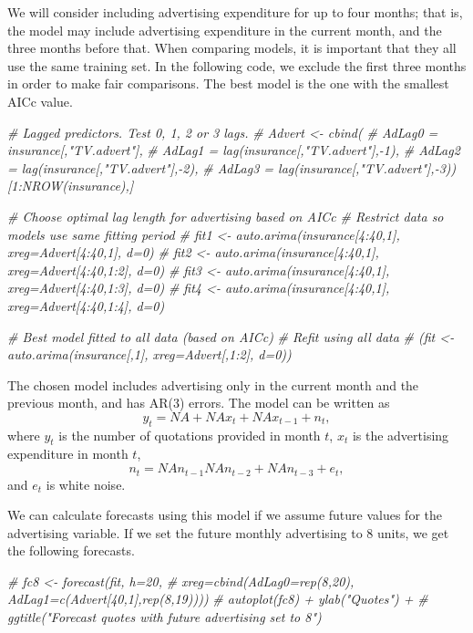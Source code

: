 \documentclass[]{book}
\newenvironment{Shaded}{\begin{snugshade}}{\end{snugshade}}
\newcommand{\CommentTok}[1]{\textcolor[rgb]{0.56,0.35,0.01}{\textit{#1}}}
\begin{document}
We will consider including advertising expenditure for up to four months; that is, the model may include advertising expenditure in the current month, and the three months before that. When comparing models, it is important that they all use the same training set. In the following code, we exclude the first three months in order to make fair comparisons. The best model is the one with the smallest AICc value.

\begin{Shaded}
\begin{Highlighting}[]
\CommentTok{# Lagged predictors. Test 0, 1, 2 or 3 lags.}
\CommentTok{# Advert <- cbind(}
\CommentTok{#   AdLag0 = insurance[,"TV.advert"],}
\CommentTok{#   AdLag1 = lag(insurance[,"TV.advert"],-1),}
\CommentTok{#   AdLag2 = lag(insurance[,"TV.advert"],-2),}
\CommentTok{#   AdLag3 = lag(insurance[,"TV.advert"],-3))[1:NROW(insurance),]}

\CommentTok{# Choose optimal lag length for advertising based on AICc}
\CommentTok{# Restrict data so models use same fitting period}
\CommentTok{# fit1 <- auto.arima(insurance[4:40,1], xreg=Advert[4:40,1], d=0)}
\CommentTok{# fit2 <- auto.arima(insurance[4:40,1], xreg=Advert[4:40,1:2], d=0)}
\CommentTok{# fit3 <- auto.arima(insurance[4:40,1], xreg=Advert[4:40,1:3], d=0)}
\CommentTok{# fit4 <- auto.arima(insurance[4:40,1], xreg=Advert[4:40,1:4], d=0)}

\CommentTok{# Best model fitted to all data (based on AICc)}
\CommentTok{# Refit using all data}
\CommentTok{# (fit <- auto.arima(insurance[,1], xreg=Advert[,1:2], d=0))}
\end{Highlighting}
\end{Shaded}

The chosen model includes advertising only in the current month and the previous month, and has AR(3) errors. The model can be written as
\[
  y_t = NA +
         NA x_t +
         NA x_{t-1} + n_t,
\]
where \(y_t\) is the number of quotations provided in month \(t\), \(x_t\) is the advertising expenditure in month \(t\),
\[
  n_t = NA n_{t-1}
        NA n_{t-2} +
        NA n_{t-3} + e_t,
\]
and \(e_t\) is white noise.

We can calculate forecasts using this model if we assume future values for the advertising variable. If we set the future monthly advertising to 8 units, we get the following forecasts.

\begin{Shaded}
\begin{Highlighting}[]
\CommentTok{# fc8 <- forecast(fit, h=20,}
\CommentTok{#   xreg=cbind(AdLag0=rep(8,20), AdLag1=c(Advert[40,1],rep(8,19))))}
\CommentTok{# autoplot(fc8) + ylab("Quotes") +}
\CommentTok{#   ggtitle("Forecast quotes with future advertising set to 8")}
\end{Highlighting}
\end{Shaded}
\end{document}
